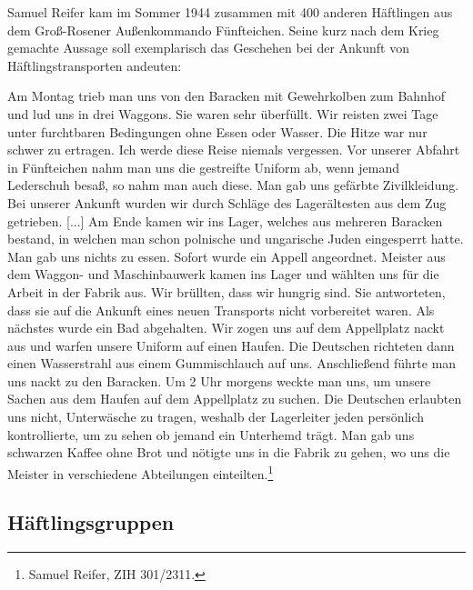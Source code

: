 \documentclass[a4paper,12pt,ngerman,
]{nisebook}
\begin{document}
Samuel Reifer kam im Sommer 1944 zusammen mit 400 anderen Häftlingen aus dem Groß-Rosener Außenkommando Fünfteichen. Seine kurz nach dem Krieg gemachte Aussage soll exemplarisch das Geschehen bei der Ankunft von Häftlingstransporten andeuten:
\begin{leftbar}
Am Montag trieb man uns von den Baracken mit Gewehrkolben zum Bahnhof und lud uns in drei Waggons.
Sie waren sehr überfüllt. Wir reisten zwei Tage unter furchtbaren Bedingungen ohne Essen oder Wasser. Die Hitze war nur schwer zu ertragen. Ich werde diese Reise niemals vergessen. Vor unserer Abfahrt in Fünfteichen nahm man uns die gestreifte Uniform ab, wenn jemand Lederschuh besaß, so nahm man auch diese. Man gab uns gefärbte Zivilkleidung.
Bei unserer Ankunft wurden wir durch Schläge des Lagerältesten aus dem Zug getrieben. [...]
Am Ende kamen wir ins Lager, welches aus mehreren Baracken bestand, in welchen man schon polnische und ungarische Juden eingesperrt hatte. Man gab uns nichts zu essen. Sofort wurde ein Appell angeordnet. Meister aus dem Waggon- und Maschinbauwerk kamen ins Lager und wählten uns für die Arbeit in der Fabrik aus. Wir brüllten, dass wir hungrig sind. Sie antworteten, dass sie auf die Ankunft eines neuen Transports nicht vorbereitet waren.
Als nächstes wurde ein Bad abgehalten. Wir zogen uns auf dem Appellplatz nackt aus und warfen unsere Uniform auf einen Haufen. Die Deutschen richteten dann einen Wasserstrahl aus einem Gummischlauch auf uns. Anschließend führte man uns nackt zu den Baracken. Um 2 Uhr morgens weckte man uns, um unsere Sachen aus dem Haufen auf dem Appellplatz zu suchen. Die Deutschen erlaubten uns nicht, Unterwäsche zu tragen, weshalb der Lagerleiter jeden persönlich kontrollierte, um zu sehen ob jemand ein Unterhemd trägt. Man gab uns schwarzen Kaffee ohne Brot und nötigte uns in die Fabrik zu gehen, wo uns die Meister in verschiedene Abteilungen einteilten.\footnote{Samuel Reifer, ZIH 301/2311.}
\end{leftbar}





\subsection{Häftlingsgruppen}
\end{document}
